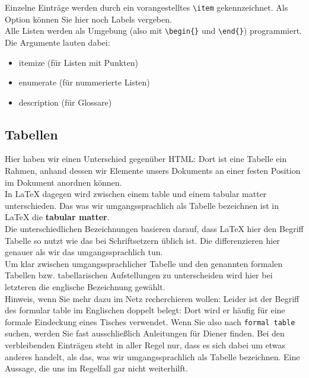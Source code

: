 Einzelne Einträge werden durch ein vorangestelltes \verb|\item| gekennzeichnet. Als Option können Sie hier noch Labels vergeben.\\

Alle Listen werden als Umgebung (also mit \verb|\begin{}| und \verb|\end{}|) programmiert. Die Argumente lauten dabei:

\begin{itemize}
	\item itemize (für Listen mit Punkten)
	\item enumerate (für nummerierte Listen)
	\item description (für Glossare)
\end{itemize}

\subsection{Tabellen}

Hier haben wir einen Unterschied gegenüber HTML: Dort ist eine Tabelle ein Rahmen, anhand dessen wir Elemente unsers Dokuments an einer festen Position im Dokument anordnen können. \\

In LaTeX dagegen wird zwischen einem table und einem tabular matter unterschieden. Das was wir umgangssprachlich als Tabelle bezeichnen ist in LaTeX die \textbf{tabular matter}.\\

Die unterschiedlichen Bezeichnungen basieren darauf, dass LaTeX hier den Begriff Tabelle so nutzt wie das bei Schriftsetzern üblich ist. Die differenzieren hier genauer als wir das umgangssprachlich tun.\\

Um klar zwischen umgangssprachlicher Tabelle und den genannten formalen Tabellen bzw. tabellarischen Aufstellungen zu unterscheiden wird hier bei letzteren die englische Bezeichnung gewählt.\\

Hinweis, wenn Sie mehr dazu im Netz recherchieren wollen: Leider ist der Begriff des formular table im Englischen doppelt belegt: Dort wird er häufig für eine formale Eindeckung eines Tisches verwendet. Wenn Sie also nach \verb|formal table| suchen, werden Sie fast ausschließlich Anleitungen für Diener finden. Bei den verbleibenden Einträgen steht in aller Regel nur, dass es sich dabei um etwas anderes handelt, als das, was wir umgangssprachlich als Tabelle bezeichnen. Eine Aussage, die uns im Regelfall gar nicht weiterhilft.

